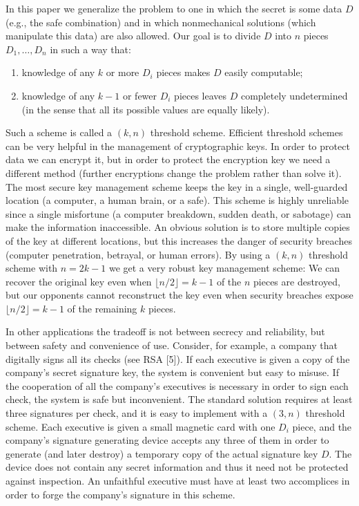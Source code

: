 In this paper we generalize the problem to one in which the
secret is some data $D$ (e.g., the safe combination) and in
which nonmechanical solutions (which manipulate this data)
are also allowed. Our goal is to divide $D$ into $n$ pieces $D_1, \ldots, D_n$ in such a way that:
\begin{enumerate}
	\item knowledge of any $k$ or more $D_i$ pieces makes $D$ easily computable;
	\item knowledge of any $k - 1$ or fewer $D_i$ pieces leaves $D$ completely undetermined
	      (in the sense that all its possible values are equally likely).
\end{enumerate}

Such a scheme is called a $(k, n)$ threshold scheme. Efficient threshold schemes
can be very helpful in the management of cryptographic keys.
In order to protect data we can encrypt it, but in order to protect
the encryption key we need a different method (further encryptions change
the problem rather than solve it). The most secure key management scheme
keeps the key in a single, well-guarded location (a computer, a human brain,
or a safe). This scheme is highly unreliable since a single misfortune
(a computer breakdown, sudden death, or sabotage) can make the information
inaccessible. An obvious solution is to store multiple copies of the key at
different locations, but this increases the danger of security breaches
(computer penetration, betrayal, or human errors). By using a $(k, n)$
threshold scheme with $n = 2k - 1$ we get a very robust key management scheme:
We can recover the original key even when $\lfloor n/2 \rfloor = k - 1$ of
the $n$ pieces are destroyed, but our opponents cannot reconstruct the key
even when security breaches expose $\lfloor n/2 \rfloor = k - 1$ of the remaining $k$ pieces.

In other applications the tradeoff is not between secrecy and reliability,
but between safety and convenience of use. Consider, for example,
a company that digitally signs all its checks (see RSA [5]).
If each executive is given a copy of the company's secret signature key,
the system is convenient but easy to misuse. If the cooperation of all the
company's executives is necessary in order to sign each check, the system
is safe but inconvenient. The standard solution requires at least three
signatures per check, and it is easy to implement with a $(3, n)$ threshold scheme.
Each executive is given a small magnetic card with one $D_i$ piece,
and the company's signature generating device accepts any three of them
in order to generate (and later destroy) a temporary copy of the actual
signature key $D$. The device does not contain any secret information and
thus it need not be protected against inspection. An unfaithful executive
must have at least two accomplices in order to forge the company's signature in this scheme.

